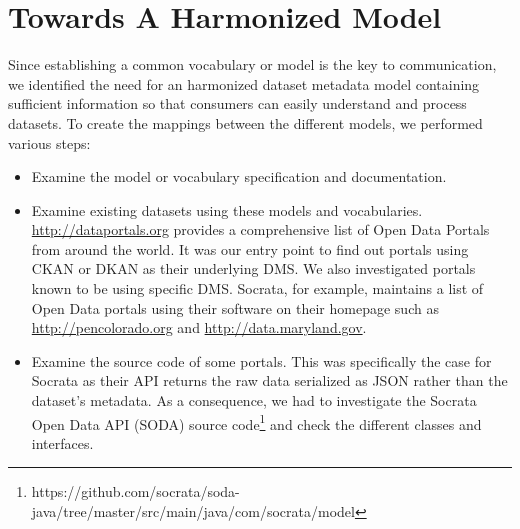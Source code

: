 \documentclass[runningheads,a4paper]{../../Tools/LaTEX/llncs}
\begin{document}
\section{Towards A Harmonized Model}
\label{sec:hdl}
Since establishing a common vocabulary or model is the key to communication, we identified the need for an harmonized dataset metadata model containing sufficient information so that consumers can easily understand and process datasets. To create the mappings between the different models, we performed various steps:
\begin{itemize}
  \item Examine the model or vocabulary specification and documentation.
  \item Examine existing datasets using these models and vocabularies. \url{http://dataportals.org} provides a comprehensive list of Open Data Portals from around the world. It was our entry point to find out portals using CKAN or DKAN as their underlying DMS. We also investigated portals known to be using specific DMS. Socrata, for example, maintains a list of Open Data portals using their software on their homepage such as \url{http://pencolorado.org} and \url{http://data.maryland.gov}.
  \item Examine the source code of some portals. This was specifically the case for Socrata as their API returns the raw data serialized as JSON rather than the dataset's metadata. As a consequence, we had to investigate the Socrata Open Data API (SODA) source code\footnote{https://github.com/socrata/soda-java/tree/master/src/main/java/com/socrata/model} and check the different classes and interfaces.
\end{itemize}
\end{document}
